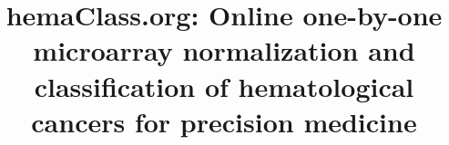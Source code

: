 \documentclass[twocolumn]{bmcart}%
\begin{document}
\begin{frontmatter}

\begin{fmbox}


\title{hemaClass.org: Online one-by-one microarray normalization and classification of hematological cancers for precision medicine}


\author[
   addressref={aff1},                   %
   noteref={n1}                       %
]{ }
\author[
   addressref={aff1,aff2},                   %
   noteref={n1}                        %
]{ }
\author[
   addressref={aff1,aff2}                   %
]{ }
\author[
   addressref={aff1,aff2}                   %
]{ }
\author[
   addressref={aff1,aff2}                   %
]{ }
\author[
   addressref={aff1}                   %
]{ }
\author[
   addressref={aff1}                  %
]{ }
\author[
   addressref={aff1}                  %
]{ }
\author[
   addressref={aff3}                  %
]{ }
\author[
   addressref={aff1,aff2}                  %
]{ }
\author[
   addressref={aff1,aff2}                 %
]{ }
\author[
   addressref={aff1,aff2},
   corref={aff1},                       %
   email={mboegsted@dcm.aau.dk}
]{ }


\end{fmbox}
\end{frontmatter}
\end{document}
